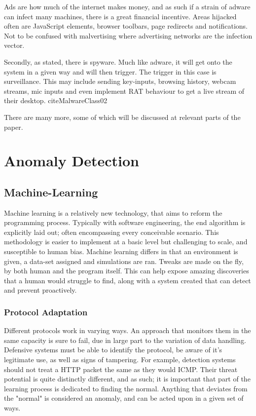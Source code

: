 Ads are how much of the internet makes money, and as such if a strain of adware can infect many machines, there is a great financial incentive.
Areas hijacked often are JavaScript elements, browser toolbars, page redirects and notifications. Not to be confused with malvertising where advertising networks are the infection vector. \citep{MalwareClass} 

Secondly, as stated, there is spyware. Much like adware, it will get onto the system in a given way and will then trigger. The trigger in this case is surveillance. This may include sending
key-inputs, browsing history, webcam streams, mic inputs and even implement RAT behaviour to get a live stream of their desktop. cite{MalwareClass02}  \citep{MalwareClass} 



There are many more, some of which will be discussed at relevant parts of the paper.


\section{Anomaly Detection}
\subsection{Machine-Learning}
Machine learning is a relatively new technology, that aims to reform the programming process. Typically with software engineering, the end algorithm is explicitly laid out; often encompassing every conceivable scenario.
This methodology is easier to implement at a basic level but challenging to scale, and susceptible to human bias. Machine learning differs in that an environment is given, a data-set assigned and simulations are ran. 
Tweaks are made on the fly, by both human and the program itself. This can help expose amazing discoveries that a human would struggle to find, along with a system created that can detect and prevent proactively.

\subsubsection{Protocol Adaptation}
Different protocols work in varying ways. An approach that monitors them in the same capacity is sure to fail, due in large part to the variation of data handling. Defensive systems must be able to identify the protocol,
be aware of it's legitimate use, as well as signs of tampering. For example, detection systems should not treat a HTTP packet the same as they would ICMP. Their threat potential is quite distinctly different, and as such;
it is important that part of the learning process is dedicated to finding the normal. Anything that deviates from the "normal" is considered an anomaly, and can be acted upon in a given set of ways.

